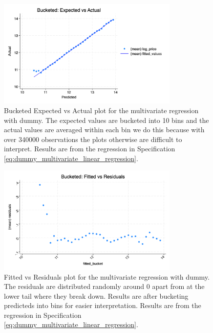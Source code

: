\begin{figure}
    \centering
    \includegraphics[width=0.8\textwidth]{../figs/bucketed_dummy_expected_vs_actual.png}
    \caption{Bucketed Expected vs Actual plot for the multivariate regression with dummy. The expected values are bucketed into 10 bins and the actual values are averaged within each bin
    we do this because with over 340000 observations the plots otherwise are difficult to interpret.
    Results are from the regression in Specification \ref{eq:dummy_multivariate_linear_regression}.}
    \label{MV_dummy_bucketed_predicted_vs_actual}
\end{figure}

\begin{figure}
    \centering
    \includegraphics[width=0.8\textwidth]{../figs/dummy_fitted_vs_residuals.png}
    \caption{Fitted vs Residuals plot for the multivariate regression with dummy. The residuals are distributed randomly around 0 apart from at the lower tail where they break down.
    Results are after bucketing predicteds into bins for easier interpretation.
    Results are from the regression in Specification \ref{eq:dummy_multivariate_linear_regression}.}
    \label{MV_dummy_fitted_vs_residuals}
\end{figure}


